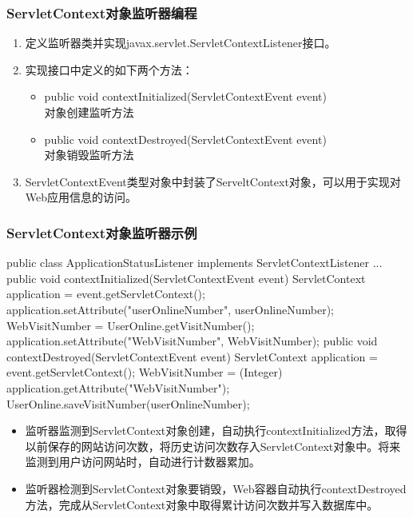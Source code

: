 \begin{frame}[fragile] %
\frametitle{ServletContext对象监听器编程} 

\begin{enumerate}
\item 定义监听器类并实现javax.servlet.ServletContextListener接口。
\item 实现接口中定义的如下两个方法：
  \begin{itemize}
  \item public void contextInitialized(ServletContextEvent event) \\对象创建监听方法
  \item public void contextDestroyed(ServletContextEvent event) \\对象销毁监听方法
  \end{itemize}
\item ServletContextEvent类型对象中封装了ServeltContext对象，可以用于实现对Web应用信息的访问。
\end{enumerate}
\end{frame}

\begin{frame}[fragile] %
\frametitle{ServletContext对象监听器示例} 

\begin{javaCode}
public class ApplicationStatusListener implements ServletContextListener {
  ...
  public void contextInitialized(ServletContextEvent event) {
    ServletContext application = event.getServletContext();
    application.setAttribute("userOnlineNumber", userOnlineNumber);
    WebVisitNumber = UserOnline.getVisitNumber();
    application.setAttribute("WebVisitNumber", WebVisitNumber);
  }
  public void contextDestroyed(ServletContextEvent event) {
    ServletContext application = event.getServletContext();
    WebVisitNumber = (Integer) application.getAttribute("WebVisitNumber");
    UserOnline.saveVisitNumber(userOnlineNumber);
  }
}  
\end{javaCode}

\begin{itemize}\kai
\item 监听器监测到ServletContext对象创建，自动执行contextInitialized方法，取得以前保存的网站访问次数，将历史访问次数存入ServletContext对象中。将来监测到用户访问网站时，自动进行计数器累加。
\item 监听器检测到ServletContext对象要销毁，Web容器自动执行contextDestroyed方法，完成从ServletContext对象中取得累计访问次数并写入数据库中。
\end{itemize}
\end{frame}


